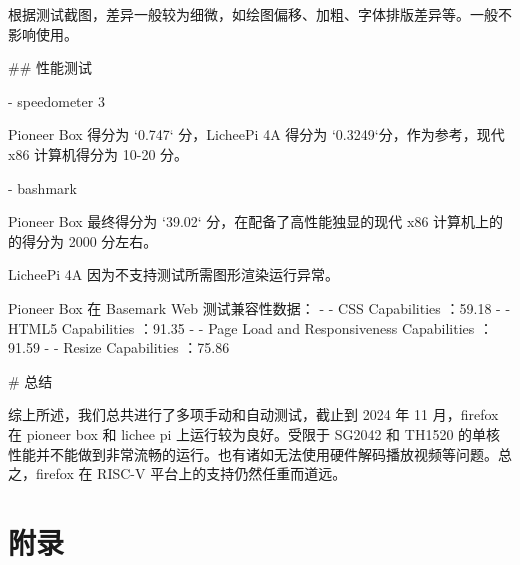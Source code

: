 \documentclass{article}
\begin{document}
\begin{markdown}
根据测试截图，差异一般较为细微，如绘图偏移、加粗、字体排版差异等。一般不影响使用。

## 性能测试

- speedometer 3

Pioneer Box 得分为 `0.747` 分，LicheePi 4A 得分为 `0.3249`分，作为参考，现代 x86 计算机得分为 10-20 分。

- bashmark

Pioneer Box 最终得分为 `39.02` 分，在配备了高性能独显的现代 x86 计算机上的的得分为 2000 分左右。

LicheePi 4A 因为不支持测试所需图形渲染运行异常。

Pioneer Box 在 Basemark Web 测试兼容性数据：
- - CSS Capabilities ：59.18%
- - HTML5 Capabilities ：91.35%
- - Page Load and Responsiveness Capabilities ：91.59%
- - Resize Capabilities ：75.86%

# 总结

综上所述，我们总共进行了多项手动和自动测试，截止到 2024 年 11 月，firefox 在 pioneer box 和 lichee pi 上运行较为良好。受限于 SG2042 和 TH1520 的单核性能并不能做到非常流畅的运行。也有诸如无法使用硬件解码播放视频等问题。总之，firefox 在 RISC-V 平台上的支持仍然任重而道远。


\end{markdown}

\newpage
\section*{附录}

\appendix

\end{document}
